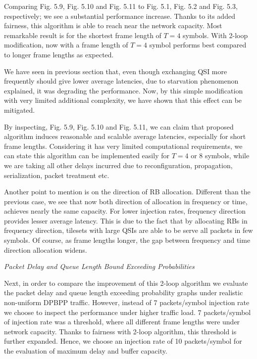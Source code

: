 Comparing Fig. 5.9, Fig. 5.10 and Fig. 5.11 to Fig. 5.1, Fig. 5.2 and Fig. 5.3, respectively; we see a substantial performance increase. Thanks to its added fairness, this algorithm is able to reach near the network capacity. Most remarkable result is for the shortest frame length of $T=4$ symbols. With 2-loop modification, now with a frame length of $T=4$ symbol performs best compared to longer frame lengths as expected. 

We have seen in previous section that, even though exchanging QSI more frequently should give lower average latencies, due to starvation phenomenon explained, it was degrading the performance. Now, by this simple modification with very limited additional complexity, we have shown that this effect can be mitigated. 

By inspecting, Fig. 5.9, Fig. 5.10 and Fig. 5.11, we can claim that proposed algorithm induces reasonable and scalable average latencies, especially for short frame lengths. Considering it has very limited computational requirements, we can state this algorithm can be implemented easily for $T=4$ or $8$ symbols, while we are taking all other delays incurred due to reconfiguration, propagation, serialization, packet treatment etc.

Another point to mention is on the direction of RB allocation. Different than the previous case, we see that now both direction of allocation in frequency or time, achieves nearly the same capacity. For lower injection rates, frequency direction provides lesser average latency. This is due to the fact that by allocating RBs in frequency direction, tilesets with large QSIs are able to be serve all packets in few symbols. Of course, as frame lengths longer, the gap between frequency and time direction allocation widens. 

\textit{Packet Delay and Queue Length Bound Exceeding Probabilities}


Next, in order to compare the improvement of this 2-loop algorithm we evaluate the packet delay and queue length exceeding probability graphs under realistic non-uniform DPBPP traffic. However, instead of 7 packets/symbol injection rate we choose to inspect the performance under higher traffic load. 7 packets/symbol of injection rate was a threshold, where all different frame lengths were under network capacity. Thanks to fairness with 2-loop algorithm, this threshold is further expanded. Hence, we choose an injection rate of 10 packets/symbol for the evaluation of maximum delay and buffer capacity. 

